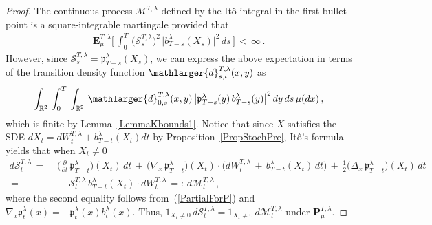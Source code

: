 \documentclass[10pt]{article}
\numberwithin{equation}{section}
\theoremstyle{definition}
\newcommand{\R}{{\mathbb R}}
\begin{document}
\begin{proof}   The continuous process $\mathcal{M}^{T,\lambda}$ defined by the It\^o integral in the first bullet point is a square-integrable martingale provided that
\begin{align}\label{DipDap}
 \mathbf{E}^{T,\lambda}_{\mu}\bigg[\,\int_0^{T} \,\big(\mathcal{S}_{s}^{T,\lambda}\big)^2\,\big|b_{T-s}^{\lambda}(X_s)\big|^2 \, ds\,\bigg]  \,<\,\infty\,.
\end{align}
 However, since $\mathcal{S}_{s}^{T,\lambda} =\mathfrak{p}_{T-s}^{\lambda}(X_s)  $, we can express the above expectation in terms of the transition  density function $\mathlarger{d}_{s,t}^{T,\lambda}(x,y)$ as
\begin{align*}
  \int_{\R^2} \, \int_0^{T}\,\int_{\R^2}\,  \mathlarger{d}_{0,s}^{T,\lambda}(x,y) \,\big|\mathfrak{p}_{T-s}^{\lambda}(y)\,b_{T-s}^{\lambda}(y)  \big|^2 \,  dy  \, ds \,  \mu(dx)  \,,
\end{align*}
which is finite by  Lemma~\ref{LemmaKbounds1}.  Notice that since $X$ satisfies the SDE $dX_t=dW_{t}^{T,\lambda} + b_{T-t}^{\lambda}(X_t)  dt$ by Proposition~\ref{PropStochPre},  It\^o's formula yields that when $X_t \neq 0$ 
\begin{align}\label{BooT}
d\mathcal{S}_{t}^{T,\lambda}
\,=\,&\, \Big(\frac{\partial}{\partial t}\,\mathfrak{p}_{T-t}^{\lambda}\Big)(X_t)\,dt \,+\,\big(\nabla_x\, \mathfrak{p}_{T-t}^{\lambda}\big)(X_t)\cdot \Big( dW_{t}^{T,\lambda}\,+ \,b_{T-t}^{\lambda}(X_t) \, dt \Big)\,+\,\frac{1}{2}\big(\Delta_x\, \mathfrak{p}_{T-t}^{\lambda}\big)(X_t)\, dt \nonumber  \\ \,=\,&\,-\mathcal{S}_{t}^{T,\lambda}\,b_{T-t}^{\lambda}(X_t) \cdot dW_{t}^{T,\lambda} \,=:\, d\mathcal{M}_{t}^{T,\lambda}  \,,
\end{align}
where the second equality follows from~(\ref{PartialForP}) and $\nabla_x \mathfrak{p}_{t}^{\lambda}(x)=-  \mathfrak{p}_{t}^{\lambda}(x)b_t^{\lambda}(x) $. Thus, $1_{X_t\neq 0}\,d\mathcal{S}_{t}^{T,\lambda} =1_{X_t\neq 0}\,d\mathcal{M}_{t}^{T,\lambda} $ under $\mathbf{P}^{T,\lambda}_{\mu}$.
 

\end{proof}
\end{document}
